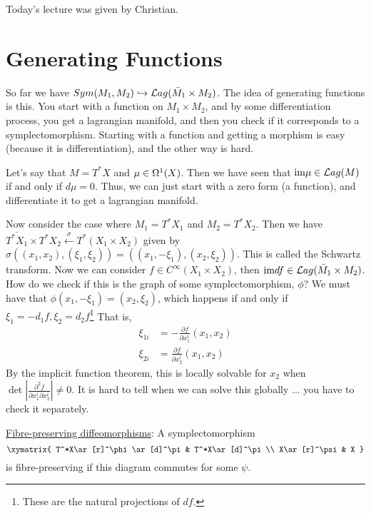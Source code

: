 
 \setcounter{lecture}{4}

 Today's lecture was given by Christian.

 \section*{Generating Functions}

 So far we have $Sym(M_1,M_2)\hookrightarrow\mathcal{L}ag(\bar M_1\times
 M_2)$.  The idea of generating functions is this.  You start with
 a function on $M_1\times M_2$, and by some differentiation
 process, you get a lagrangian manifold, and then you check if it
 corresponds to a symplectomorphism.  Starting with a function and
 getting a morphism is easy (because it is differentiation), and
 the other way is hard.

 Let's say that $M=T^*X$ and $\mu\in \Omega^1(X)$.  Then we have seen
 that $\text{im} \mu\in \mathcal{L}ag(M)$ if and only if $d\mu=0$.  Thus, we can
 just start with a zero form (a function), and differentiate it to
 get a lagrangian manifold.

 Now consider the case where $M_1=T^*X_1$ and $M_2=T^*X_2$.  Then
 we have $\overline{T^*X_1}\times T^*X_2\xleftarrow{\sigma}
 T^*(X_1\times X_2)$ given by $\sigma((x_1,x_2),(\xi_1,\xi_2)) =
 ((x_1,-\xi_1),(x_2,\xi_2))$.  This is called the Schwartz
 transform.  Now we can consider $f\in C^\infty(X_1\times X_2)$,
 then $\text{im} df \in \mathcal{L}ag(\bar M_1\times M_2)$.  How do we check if
 this is the graph of some symplectomorphism, $\phi$?  We must
 have that $\phi(x_1,-\xi_1)=(x_2,\xi_2)$, which happens if and
 only if $\xi_1=-d_1f, \xi_2=d_2f$\footnote{These are the natural
 projections of $df$.}  That is,
 \begin{align*}
   \xi_{1i} &= -\frac{\partial f}{\partial x_1^i}(x_1,x_2)\\
   \xi_{2i} &= \frac{\partial f}{\partial x_2^i}(x_1,x_2)
 \end{align*}
 By the implicit function theorem, this is locally solvable for
 $x_2$ when $\det \left| \frac{\partial^2 f}{\partial x_1^i \partial x_2^i}
 \right|\not=0$.  It is hard to tell when we can solve this
 globally ... you have to check it separately.

 \underline{Fibre-preserving diffeomorphisms}: A symplectomorphism
 \[\xymatrix{
  T^*X\ar[r]^\phi \ar[d]^\pi & T^*X\ar[d]^\pi\\
  X\ar[r]^\psi & X
  }\]
  is fibre-preserving if this diagram commutes for some $\psi$.

